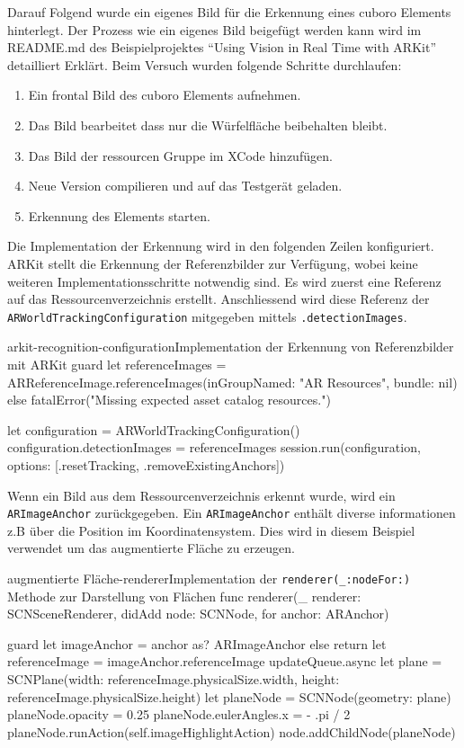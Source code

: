 \begin{description}
	Darauf Folgend wurde ein eigenes Bild für die Erkennung eines cuboro Elements hinterlegt. Der Prozess wie ein eigenes Bild beigefügt werden kann wird im README.md des Beispielprojektes "`Using Vision in Real Time with ARKit"' detailliert Erklärt. Beim Versuch wurden folgende Schritte durchlaufen:

	\begin{enumerate}
		\item Ein frontal Bild des cuboro Elements aufnehmen. 
		\item Das Bild bearbeitet dass nur die Würfelfläche beibehalten bleibt.
		\item Das Bild der ressourcen Gruppe im XCode hinzufügen.
		\item Neue Version compilieren und auf das Testgerät geladen.
		\item Erkennung des Elements starten.  
	\end{enumerate}



	Die Implementation der Erkennung wird in den folgenden Zeilen konfiguriert. ARKit stellt die Erkennung der Referenzbilder zur Verfügung, wobei keine weiteren Implementationsschritte notwendig sind. Es wird zuerst eine Referenz auf das Ressourcenverzeichnis erstellt. Anschliessend wird diese Referenz der \texttt{ARWorldTrackingConfiguration} mitgegeben mittels \texttt{.detectionImages}.
	\begin{code}{arkit-recognition-configuration}{Implementation der Erkennung von Referenzbilder mit ARKit}
	guard let referenceImages = ARReferenceImage.referenceImages(inGroupNamed: "AR Resources", bundle: nil) else {
		fatalError("Missing expected asset catalog resources.")
	}
	
	let configuration = ARWorldTrackingConfiguration()
	configuration.detectionImages = referenceImages
	session.run(configuration, options: [.resetTracking, .removeExistingAnchors])
	\end{code}

	Wenn ein Bild aus dem Ressourcenverzeichnis erkennt wurde, wird ein \texttt{ARImageAnchor} zurückgegeben. Ein \texttt{ARImageAnchor} enthält diverse informationen z.B über die Position im Koordinatensystem. Dies wird in diesem Beispiel verwendet um das augmentierte Fläche zu erzeugen. 

	\begin{code}{augmentierte Fläche-renderer}{Implementation der \texttt{renderer(\_:nodeFor:)} Methode zur Darstellung von Flächen}
		func renderer(_ renderer: SCNSceneRenderer, didAdd node: SCNNode, for anchor: ARAnchor) {
			guard let imageAnchor = anchor as? ARImageAnchor else { return }
			let referenceImage = imageAnchor.referenceImage
			updateQueue.async {
				let plane = SCNPlane(width: referenceImage.physicalSize.width,
									height: referenceImage.physicalSize.height)
				let planeNode = SCNNode(geometry: plane)
				planeNode.opacity = 0.25
				planeNode.eulerAngles.x =  - .pi / 2
				planeNode.runAction(self.imageHighlightAction)
				node.addChildNode(planeNode)
			}

}
\end{code}
\end{description}
